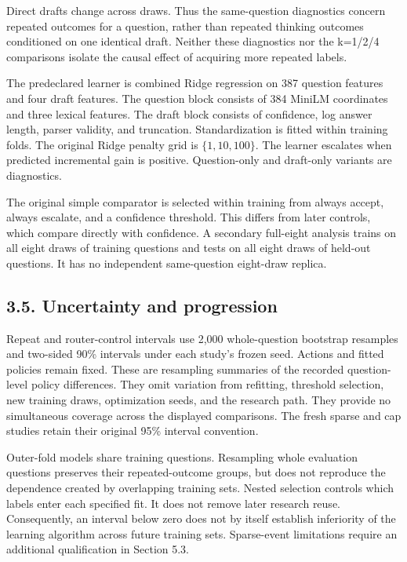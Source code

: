 \documentclass[11pt,a4paper]{article}
\begin{document}
Direct drafts change across draws. Thus the same-question diagnostics concern repeated outcomes for a question, rather than repeated thinking outcomes conditioned on one identical draft. Neither these diagnostics nor the k=1/2/4 comparisons isolate the causal effect of acquiring more repeated labels.

The predeclared learner is combined Ridge regression on 387 question features and four draft features. The question block consists of 384 MiniLM coordinates and three lexical features. The draft block consists of confidence, log answer length, parser validity, and truncation. Standardization is fitted within training folds. The original Ridge penalty grid is \(\{1,10,100\}\). The learner escalates when predicted incremental gain is positive. Question-only and draft-only variants are diagnostics.

The original simple comparator is selected within training from always accept, always escalate, and a confidence threshold. This differs from later controls, which compare directly with confidence. A secondary full-eight analysis trains on all eight draws of training questions and tests on all eight draws of held-out questions. It has no independent same-question eight-draw replica.

\subsection*{3.5. Uncertainty and progression}\label{sec:35-uncertainty-and-progression}
Repeat and router-control intervals use 2,000 whole-question bootstrap resamples and two-sided 90\% intervals under each study's frozen seed. Actions and fitted policies remain fixed. These are resampling summaries of the recorded question-level policy differences. They omit variation from refitting, threshold selection, new training draws, optimization seeds, and the research path. They provide no simultaneous coverage across the displayed comparisons. The fresh sparse and cap studies retain their original 95\% interval convention.

Outer-fold models share training questions. Resampling whole evaluation questions preserves their repeated-outcome groups, but does not reproduce the dependence created by overlapping training sets. Nested selection controls which labels enter each specified fit. It does not remove later research reuse. Consequently, an interval below zero does not by itself establish inferiority of the learning algorithm across future training sets. Sparse-event limitations require an additional qualification in Section 5.3.
\end{document}
